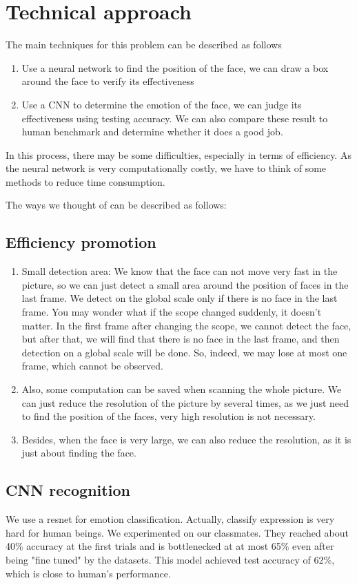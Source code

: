 \section{Technical approach}
The main techniques for this problem can be described as follows
\begin{enumerate}
    \item Use a neural network to find the position of the face, we can draw a box around the face to verify its effectiveness
    \item Use a CNN to determine the emotion of the face, we can judge its effectiveness using testing accuracy. We can also compare these result to human benchmark and determine whether it does a good job.
\end{enumerate}
In this process, there may be some difficulties, especially in terms of efficiency. As the neural network is very computationally costly, we have to think of some methods to reduce time consumption.

The ways we thought of can be described as follows:
\subsection{Efficiency promotion}
\begin{enumerate}
    \item Small detection area: We know that the face can not move very fast in the picture, so we can just detect a small area around the position of faces in the last frame. We detect on the global scale only if there is no face in the last frame. You may wonder what if the scope changed suddenly, it doesn't matter. In the first frame after changing the scope, we cannot detect the face, but after that, we will find that there is no face in the last frame, and then detection on a global scale will be done. So, indeed, we may lose at most one frame, which cannot be observed.
    \item Also, some computation can be saved when scanning the whole picture. We can just reduce the resolution of the picture by several times, as we just need to find the position of the faces, very high resolution is not necessary.
    \item Besides, when the face is very large, we can also reduce the resolution, as it is just about finding the face.
\end{enumerate}
\subsection{CNN recognition}
We use a resnet for emotion classification. Actually, classify expression is very hard for human beings. We experimented on our classmates. They reached about 40\% accuracy at the first trials and is bottlenecked at at most 65\% even after being "fine tuned" by the datasets. This model achieved test accuracy of 62\%, which is close to human's performance.


